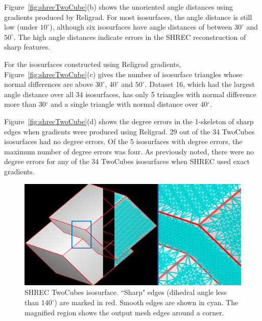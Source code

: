 Figure~\ref{fig:shrecTwoCube}(b) shows the unoriented angle distances
using gradients produced by Religrad.
For most isosurfaces, the angle distance is still low (under $10^\circ$),
although six isosurfaces have angle distances of between $30^\circ$
and $50^\circ$.
The high angle distances indicate errors in the SHREC reconstruction 
of sharp features.

For the isosurfaces constructed using Religrad gradients,
Figure~\ref{fig:shrecTwoCube}(c) gives
the number of isosurface triangles whose normal differences
are above $30^\circ$, $40^\circ$ and $50^\circ$.
Dataset 16, which had the largest angle distance over all 34 isosurfaces,
has only 5 triangles with normal difference more than 30$^\circ$ 
and a single triangle with normal distance over 40$^\circ$.  

Figure~\ref{fig:shrecTwoCube}(d) shows
the degree errors in the 1-skeleton of sharp edges
when gradients were produced using Religrad.
29 out of the 34 TwoCubes isosurfaces had no degree errors.
Of the 5 isosurfaces with degree errors,
the maximum number of degree errors was four.
As previously noted,
there were no degree errors for any of the 34 TwoCubes isosurfaces
when SHREC used exact gradients.

\begin{figure}[t]
	\includegraphics[width=\linewidth]{images/shrecPerfect.eps}
	\caption{SHREC TwoCubes isosurface. 
``Sharp" edges (dihedral angle less than $140^\circ$) are marked in red. 
Smooth edges are shown in cyan. The magnified region shows the output mesh edges around a corner.}
	\label{fig:shrecPerfect1}
\end{figure}

